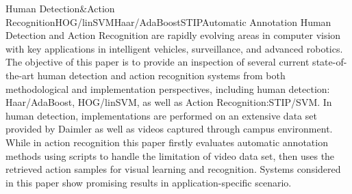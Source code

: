 
\begin{Eabstract}{Human Detection\&Action Recognition}{HOG/linSVM}{Haar/AdaBoost}{STIP}{Automatic Annotation}
Human Detection and Action Recognition are rapidly evolving areas in computer vision with key
applications in intelligent vehicles, surveillance, and advanced robotics. The objective of this
paper is to provide an inspection of several current state-of-the-art human detection and action
recognition systems from both methodological and implementation perspectives, including human
detection: Haar/AdaBoost\cite{haar}, HOG/linSVM\cite{DT2005}, as well as
Action Recognition:STIP/SVM\cite{stip}. In human detection, implementations are performed on
an extensive data set provided by Daimler as well as videos captured through campus environment. 
While in action recognition this paper firstly evaluates automatic annotation methods using scripts to
handle the limitation of video data set, then uses the retrieved action samples for visual learning
and recognition. Systems considered in this paper show promising results in application-specific scenario. 
\end{Eabstract}
